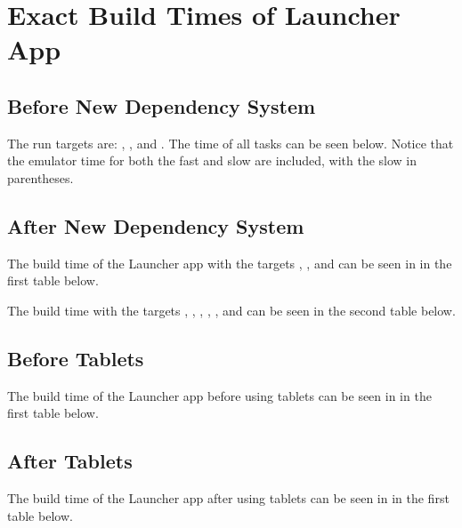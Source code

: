 \chapter{Exact Build Times of Launcher App}
\label{app:build_times}

\section{Before New Dependency System}
The run targets are: , , and . The time of all tasks can be seen below. Notice that the emulator time for both the fast and slow are included, with the slow in parentheses.



\section{After New Dependency System}
The build time of the Launcher app with the targets , , and  can be seen in in the first table below.

The build time with the targets , , , , , and  can be seen in the second table below.


\section{Before Tablets}
The build time of the Launcher app before using tablets can be seen in in the first table below.



\section{After Tablets}
The build time of the Launcher app after using tablets can be seen in in the first table below.


